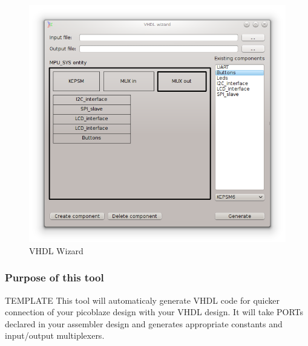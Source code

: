 \begin{figure}[h]
    \centering
    \includegraphics[width=.5\textwidth]{img/VHDL_wizard.png}
    \caption{VHDL Wizard}
\end{figure}


\subsubsection{Purpose of this tool}
    TEMPLATE
    This tool will automaticaly generate VHDL code for quicker connection of your picoblaze design with your VHDL design. It will take
    PORTs declared in your assembler design and generates appropriate constants and input/output multiplexers.

